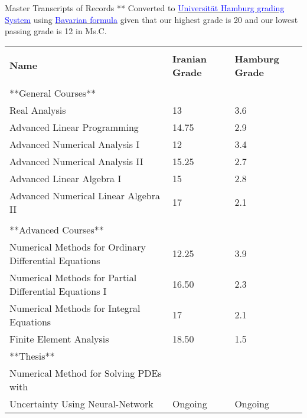 \documentclass{resume} %
\begin{document}
\begin{cSection}{Master Transcripts of Records}
	** Converted to
	\href{https://apps.unive.it/common2/file/download/destinazioni_erasmus/5a9e7b1fa49c0}{\textcolor{blue}{Universit\"{a}t Hamburg grading System}} using  \href{https://www.uni-hamburg.de/en/campuscenter/bewerbung/international/studium-mit-abschluss/anerkennung-auslaendischer-schulbildung/notenumrechner.html}{\textcolor{blue}{Bavarian formula}} given that our highest grade is 20 and our lowest passing grade is 12 in Ms.C.\\
	\begin{tabular}{ @{} >{}l @{\hspace*{3ex}} >{}l @{} >{}l}
		&&\\
		\textbf{Name} & \textbf{Iranian Grade} & \textbf{Hamburg Grade}
		\\\cline{1-3}\\
		
		**General Courses** &&\\
		Real Analysis & 13 & 3.6\\
		Advanced Linear Programming & 14.75 & 2.9\\
		
		Advanced Numerical Analysis I & 12 & 3.4\\
		Advanced Numerical Analysis II & 15.25 & 2.7\\
		
		Advanced Linear Algebra I & 15 & 2.8\\
		Advanced Numerical Linear Algebra II& 17 & 2.1 \\
		
		\cline{1-3}\\
		**Advanced Courses**&&\\
		
		Numerical Methods for Ordinary Differential Equations & 12.25 & 3.9 \\
		Numerical Methods for Partial Differential Equations I & 16.50 & 2.3\\
		Numerical Methods for Integral Equations  & 17 & 2.1\\
		Finite Element Analysis & 18.50 & 1.5\\
		**Thesis**& &\\
		Numerical Method for Solving PDEs with\\ Uncertainty Using Neural-Network  &Ongoing& Ongoing
		
		
	\end{tabular}
\end{cSection}
\end{document}
